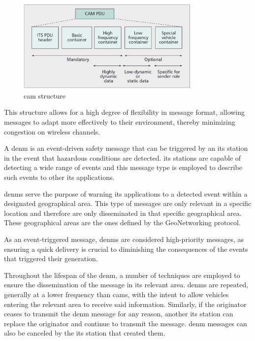 \begin{figure}[htbp]
    \centering
    \includegraphics[width=0.8\textwidth]{Chapters/Figures/VANETs/cam_structure.png}
   	\caption{\gls{cam} structure~\cite{festag_cooperative_2014}}
   	\label{fig:cam_structure}
\end{figure}

This structure allows for a high degree of flexibility in message format, allowing messages to adapt more effectively to their environment, thereby minimizing congestion on wireless channels\cite{festag_cooperative_2014}.

A \gls{denm}\cite{etsi_intelligent_2019-1} is an event-driven safety message that can be triggered by an \gls{its} station in the event that hazardous conditions are detected. \gls{its} stations are capable of detecting a wide range of events and this message type is employed to describe such events to other \gls{its} applications. 

\glspl{denm} serve the purpose of warning \gls{its} applications to a detected event within a designated geographical area\cite{festag_cooperative_2014}. This type of messages are only relevant in a specific location and therefore are only disseminated in that specific geographical area. These geographical areas are the ones defined by the GeoNetworking protocol.

As an event-triggered message, \glspl{denm} are considered high-priority messages, as ensuring a quick delivery is crucial to diminishing the consequences of the events that triggered their generation\cite{al-sultan_comprehensive_2014}.

Throughout the lifespan of the \gls{denm}, a number of techniques are employed to ensure the dissemination of the message in its relevant area. \glspl{denm} are repeated, generally at a lower frequency than \glspl{cam}, with the intent to allow vehicles entering the relevant area to receive said information. Similarly, if the originator ceases to transmit the \gls{denm} message for any reason, another \gls{its} station can replace the originator and continue to transmit the message. \gls{denm} messages can also be canceled by the \gls{its} station that created them\cite{festag_cooperative_2014}.


